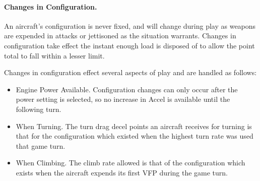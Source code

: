 \begin{advancedrules}
\paragraph{Changes in Configuration.} 
An aircraft's configuration is never fixed, and will change during play as weapons are expended in attacks or jettisoned as the situation warrants. Changes in configuration take effect the instant enough load is disposed of to allow the point total to fall within a lesser limit.

Changes in configuration effect several aspects of play and are handled as follows:

\begin{itemize}

    \item Engine Power Available. Configuration changes can only occur after the power setting is selected, so no increase in Accel is available until the following turn.


    \item When Turning. The turn drag decel points an aircraft receives for turning is that for the configuration which existed when the highest turn rate was used that game turn.

    \item When Climbing. The climb rate allowed is that of the configuration which exists when the aircraft expends its first VFP during the game turn.

\end{itemize}




\end{advancedrules}
